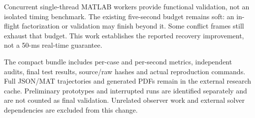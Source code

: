 \documentclass[11pt]{article}
\begin{document}
Concurrent single-thread MATLAB workers provide functional validation,
not an isolated timing benchmark. The existing five-second budget remains
soft: an in-flight factorization or validation may finish beyond it.
Some conflict frames still exhaust that budget. This work establishes
the reported recovery improvement, not a 50-ms real-time guarantee.

The compact bundle includes per-case and per-second metrics, independent
audits, final test results, source/raw hashes and actual reproduction
commands. Full JSON/MAT trajectories and generated PDFs remain in the
external research cache. Preliminary prototypes and interrupted runs are
identified separately and are not counted as final validation. Unrelated
observer work and external solver dependencies are excluded from this
change.
\end{document}
